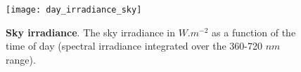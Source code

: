 \begin{figure}
\begin{center}
\texttt{[image: day\_irradiance\_sky]}\vspace{-0.5cm}
\end{center}
\caption{{\bf Sky irradiance}. The sky irradiance in $W.m^{-2}$ as a function of
the time of day (spectral irradiance integrated over the 360-720 $nm$
range).}\label{fig:sky_irradiance}
\end{figure}

